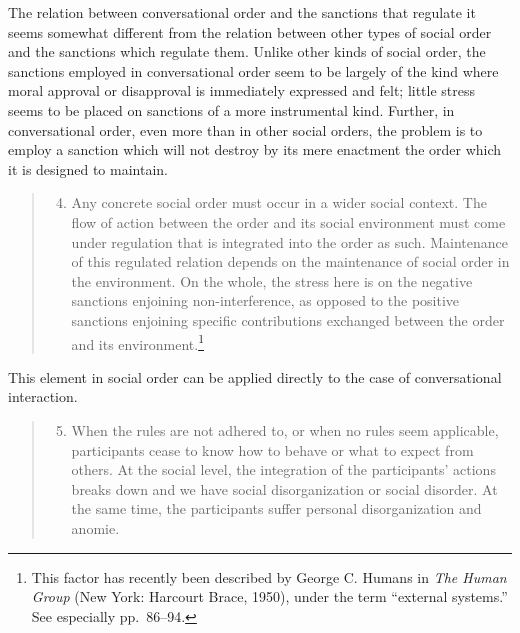 \documentclass[twoside,symmetric,nobib,justified]{tufte-book}
\begin{document}
\noindent The relation between conversational order and the sanctions that
regulate it seems somewhat different from the relation between other
types of social order and the sanctions which regulate them. Unlike
other kinds of social order, the sanctions employed in conversational
order seem to be largely of the kind where moral approval or disapproval
is immediately expressed and felt; little stress seems to be placed on
sanctions of a more instrumental kind. Further, in conversational order,
even more than in other social orders, the problem is to employ a
sanction which will not destroy by its mere enactment the order which it
is designed to maintain.

\begin{quote}
\begin{enumerate}
\setcounter{enumi}{3}
\item
  Any concrete social order must occur in a wider social context. The
  flow of action between the order and its social environment must come
  under regulation that is integrated into the order as such.
  Maintenance of this regulated relation depends on the maintenance of
  social order in the environment. On the whole, the stress here is on
  the negative sanctions enjoining non-interference, as opposed to the
  positive sanctions enjoining specific contributions exchanged between
  the order and its environment.\footnote{This factor has recently been
    described by George C. Humans in \emph{The Human Group} (New York:
    Harcourt Brace, 1950), under the term ``external systems.'' See
    especially pp.~86--94.}
\end{enumerate}
\end{quote}

\noindent This element in social order can be applied directly to the case of
conversational interaction.

\begin{quote}
\begin{enumerate}
\setcounter{enumi}{4}
\item
  When the rules are not adhered to, or when no rules seem applicable,
  participants cease to know how to behave or what to expect from
  others. At the social level, the integration of the participants'
  actions breaks down and we have social disorganization or social
  disorder. At the same time, the participants suffer personal
  disorganization and anomie.
\end{enumerate}
\end{quote}
\end{document}
